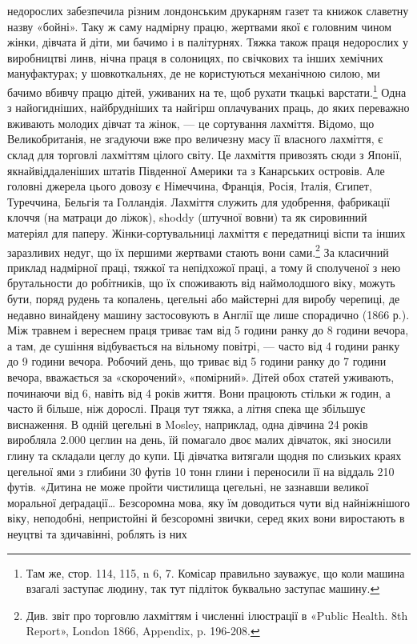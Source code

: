 \parcont{}  %
недорослих забезпечила різним лондонським друкарням газет
та книжок славетну назву «бойні». Таку ж саму надмірну
працю, жертвами якої є головним чином жінки, дівчата й діти,
ми бачимо і в палітурнях. Тяжка також праця недорослих у
виробництві линв, нічна праця в солоницях, по свічкових та інших
хемічних мануфактурах; у шовкоткальнях, де не користуються
механічною силою, ми бачимо вбивчу працю дітей, уживаних на
те, щоб рухати ткацькі варстати.\footnote{
Там же, стор. 114, 115, n 6, 7. Комісар правильно зауважує,
що коли машина взагалі заступає людину, так тут підліток буквально
заступає машину.
} Одна з найогидніших, найбрудніших
та найгірш оплачуваних праць, до яких переважно
вживають молодих дівчат та жінок, — це сортування лахміття.
Відомо, що Великобританія, не згадуючи вже про величезну масу
її власного лахміття, є склад для торговлі лахміттям цілого світу.
Це лахміття привозять сюди з Японії, якнайвіддаленіших штатів
Південної Америки та з Канарських островів. Але головні джерела
цього довозу є Німеччина, Франція, Росія, Італія, Єгипет,
Туреччина, Бельгія та Голландія. Лахміття служить для
удобрення, фабрикації клоччя (на матраци до ліжок), shoddy
(штучної вовни) та як сировинний матеріял для паперу. Жінки-сортувальниці
лахміття є передатниці віспи та інших заразливих
недуг, що їх першими жертвами стають вони сами.\footnote{
Див. звіт про торговлю лахміттям і численні ілюстрації в «Public
Health. 8th Report», London 1866, Appendix, p. 196-208.
} За класичний
приклад надмірної праці, тяжкої та непідхожої праці, а
тому й сполученої з нею брутальности до робітників, що їх споживають
від наймолодшого віку, можуть бути, поряд рудень та
копалень, цегельні або майстерні для виробу черепиці, де недавно
винайдену машину застосовують в Англії ще лише спорадично
(1866 р.). Між травнем і вереснем праця триває там від 5 години
ранку до 8 години вечора, а там, де сушіння відбувається на
вільному повітрі, — часто від 4 години ранку до 9 години вечора.
Робочий день, що триває від 5 години ранку до 7 години вечора,
вважається за «скорочений», «помірний». Дітей обох статей
уживають, починаючи від 6, навіть від 4 років життя. Вони працюють
стільки ж годин, а часто й більше, ніж дорослі. Праця
тут тяжка, а літня спека ще збільшує виснаження. В одній цегельні
в Mosley, наприклад, одна дівчина 24 років виробляла
2.000 цеглин на день, їй помагало двоє малих дівчаток, які зносили
глину та складали цеглу до купи. Ці дівчатка витягали
щодня по слизьких краях цегельної ями з глибини 30 футів 10 тонн
глини і переносили її на віддаль 210 футів. «Дитина не може
пройти чистилища цегельні, не зазнавши великої моральної
деґрадації\dots{} Безсоромна мова, яку їм доводиться чути від найніжнішого
віку, неподобні, непристойні й безсоромні звички, серед
яких вони виростають в неуцтві та здичавінні, роблять із них
\parbreak{}  %
